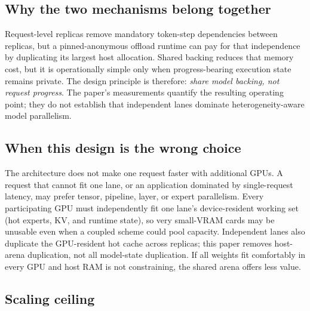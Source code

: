 \subsection{Why the two mechanisms belong together}
Request-level replicas remove mandatory token-step dependencies between replicas, but a pinned-anonymous offload runtime can pay for that independence by duplicating its largest host allocation. Shared backing reduces that memory cost, but it is operationally simple only when progress-bearing execution state remains private. The design principle is therefore: \emph{share model backing, not request progress}. The paper's measurements quantify the resulting operating point; they do not establish that independent lanes dominate heterogeneity-aware model parallelism.

\subsection{When this design is the wrong choice}
The architecture does not make one request faster with additional GPUs. A request that cannot fit one lane, or an application dominated by single-request latency, may prefer tensor, pipeline, layer, or expert parallelism. Every participating GPU must independently fit one lane's device-resident working set (hot experts, KV, and runtime state), so very small-VRAM cards may be unusable even when a coupled scheme could pool capacity. Independent lanes also duplicate the GPU-resident hot cache across replicas; this paper removes host-arena duplication, not all model-state duplication. If all weights fit comfortably in every GPU and host RAM is not constraining, the shared arena offers less value.

\subsection{Scaling ceiling}
